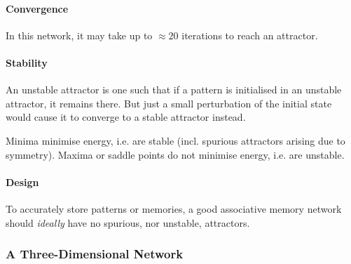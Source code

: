 \paragraph{Convergence}

In this network, it may take up to $\approx 20$ iterations to reach an attractor.

\paragraph{Stability}

An unstable attractor is one such that if a pattern is initialised in an unstable attractor, it remains there.
But just a small perturbation of the initial state would cause it to converge to a stable attractor instead.

Minima minimise energy, i.e. are stable (incl. spurious attractors arising due to symmetry).
Maxima or saddle points do not minimise energy, i.e. are unstable.

\paragraph{Design}

To accurately store patterns or memories,
a good associative memory network should \textit{ideally} have
no spurious, nor unstable, attractors.

\pagebreak

\subsubsection{A Three-Dimensional Network}

